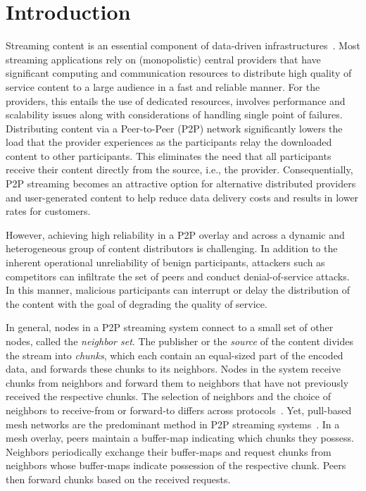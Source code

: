 \section{Introduction}
\label{sec:intro}

Streaming content is an essential component of data-driven infrastructures~\cite{emule}.
Most streaming applications rely on (monopolistic) central providers that have significant computing and communication resources to distribute high quality of service content to a large audience in a fast and reliable manner. 
For the providers, this entails the use of dedicated resources, involves performance and scalability issues along with considerations of handling single point of failures.
Distributing content via a Peer-to-Peer (P2P) network significantly lowers the load that the provider experiences as the participants relay the downloaded content to other participants. 
This eliminates the need that all participants receive their content directly from the source, i.e., the provider. 
Consequentially, P2P streaming becomes an attractive option for alternative distributed providers and user-generated content to help reduce data delivery costs and results in lower rates for customers.


However, achieving high reliability in a P2P overlay and across a dynamic and heterogeneous group of content distributors is challenging. In addition to the inherent operational unreliability of benign participants, attackers such as competitors can infiltrate the set of peers and conduct denial-of-service attacks. In this manner, malicious participants can interrupt or delay the distribution of the content with the goal of degrading the quality of service. 

In general, nodes in a P2P streaming system connect to a small set of other nodes, called the \emph{neighbor set}. 
The publisher or the \emph{source} of the content divides the stream into \emph{chunks}, which each contain an equal-sized part of the encoded data, and forwards these chunks to its neighbors. Nodes in the system receive chunks from neighbors and forward them to neighbors that have not previously received the respective chunks. 
The selection of neighbors and the choice of neighbors to receive-from or forward-to differs across protocols~\cite{sasi2014survey}.  Yet, pull-based mesh networks are the predominant method in P2P streaming systems~\cite{zhang2014modeling}. In a mesh overlay, peers maintain a buffer-map indicating which chunks they possess.  Neighbors periodically exchange their buffer-maps and request chunks from neighbors whose buffer-maps indicate possession of the respective chunk. Peers then forward chunks based on the received requests. 


